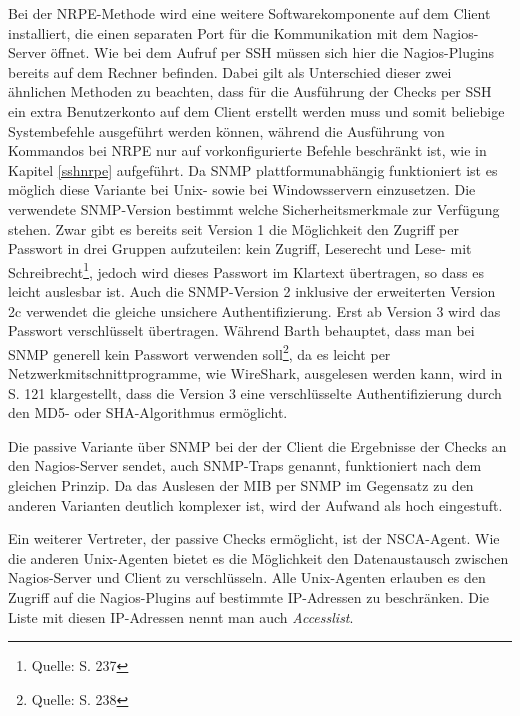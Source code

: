 Bei der \gls{NRPE}-Methode wird eine weitere Softwarekomponente auf dem Client installiert, die einen separaten Port für die Kommunikation mit dem Nagios-Server öffnet.
Wie bei dem Aufruf per \gls{SSH} müssen sich hier die Nagios-Plugins bereits auf dem Rechner befinden.
Dabei gilt als Unterschied dieser zwei ähnlichen Methoden zu beachten, dass für die Ausführung der Checks per \gls{SSH} ein extra Benutzerkonto auf dem Client erstellt werden muss und somit beliebige Systembefehle ausgeführt werden können, während die Ausführung von Kommandos bei \gls{NRPE} nur auf vorkonfigurierte Befehle beschränkt ist, wie in Kapitel \ref{sshnrpe} aufgeführt.
\label{unixagents}
Da \gls{SNMP} plattformunabhängig funktioniert ist es möglich diese Variante bei Unix- sowie bei Windowsservern einzusetzen.
Die verwendete \gls{SNMP}-Version bestimmt welche Sicherheitsmerkmale zur Verfügung stehen.
Zwar gibt es bereits seit Version 1 die Möglichkeit den Zugriff per Passwort in drei Gruppen aufzuteilen: kein Zugriff, Leserecht und Lese- mit Schreibrecht\footnote{Quelle: \cite{Barth08} S. 237}, jedoch wird dieses Passwort im Klartext übertragen, so dass es leicht auslesbar ist.
Auch die \gls{SNMP}-Version 2 inklusive der erweiterten Version 2c verwendet die gleiche unsichere Authentifizierung.
Erst ab Version 3 wird das Passwort verschlüsselt übertragen.
Während Barth behauptet, dass man bei \gls{SNMP} generell kein Passwort verwenden soll\footnote{Quelle: \cite{Barth08} S. 238}, da es leicht per Netzwerkmitschnittprogramme, wie WireShark, ausgelesen werden kann, wird in \cite{Jose07} S. 121 klargestellt, dass die Version 3 eine verschlüsselte Authentifizierung durch den MD5- oder SHA-Algorithmus ermöglicht.

Die passive Variante über \gls{SNMP} bei der der Client die Ergebnisse der Checks an den Nagios-Server sendet, auch \gls{SNMP}-Traps genannt, funktioniert nach dem gleichen Prinzip.
Da das Auslesen der \gls{MIB} per \gls{SNMP} im Gegensatz zu den anderen Varianten deutlich komplexer ist, wird der Aufwand als hoch eingestuft.

Ein weiterer Vertreter, der passive Checks ermöglicht, ist der \gls{NSCA}-Agent.
Wie die anderen Unix-Agenten bietet es die Möglichkeit den Datenaustausch zwischen Nagios-Server und Client zu verschlüsseln.
Alle Unix-Agenten erlauben es den Zugriff auf die Nagios-Plugins auf bestimmte \gls{IP}-Adressen zu beschränken.
Die Liste mit diesen \gls{IP}-Adressen nennt man auch \textit{Accesslist}.

